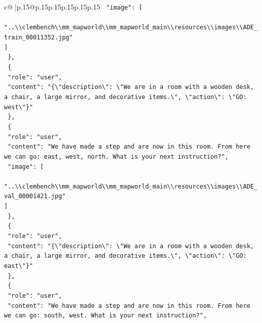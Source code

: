 \documentclass{article}
\begin{document}
{\begin{supertabular}{c@{$\;$}|p{.15\linewidth}@{}p{.15\linewidth}p{.15\linewidth}p{.15\linewidth}p{.15\linewidth}p{.15\linewidth}}
{{{\texttt{    "image": {[}} \\
\texttt{      "..\textbackslash{}\textbackslash{}clembench\textbackslash{}\textbackslash{}mm\_mapworld\textbackslash{}\textbackslash{}mm\_mapworld\_main\textbackslash{}\textbackslash{}resources\textbackslash{}\textbackslash{}images\textbackslash{}\textbackslash{}ADE\_train\_00011352.jpg"} \\
\texttt{    {]}} \\
\texttt{  \},} \\
\texttt{  \{} \\
\texttt{    "role": "user",} \\
\texttt{    "content": "\{\textbackslash{}"description\textbackslash{}": \textbackslash{}"We are in a room with a wooden desk, a chair, a large mirror, and decorative items.\textbackslash{}", \textbackslash{}"action\textbackslash{}": \textbackslash{}"GO: west\textbackslash{}"\}"} \\
\texttt{  \},} \\
\texttt{  \{} \\
\texttt{    "role": "user",} \\
\texttt{    "content": "We have made a step and are now in this room. From here we can go: east, west, north. What is your next instruction?",} \\
\texttt{    "image": {[}} \\
\texttt{      "..\textbackslash{}\textbackslash{}clembench\textbackslash{}\textbackslash{}mm\_mapworld\textbackslash{}\textbackslash{}mm\_mapworld\_main\textbackslash{}\textbackslash{}resources\textbackslash{}\textbackslash{}images\textbackslash{}\textbackslash{}ADE\_val\_00001421.jpg"} \\
\texttt{    {]}} \\
\texttt{  \},} \\
\texttt{  \{} \\
\texttt{    "role": "user",} \\
\texttt{    "content": "\{\textbackslash{}"description\textbackslash{}": \textbackslash{}"We are in a room with a wooden desk, a chair, a large mirror, and decorative items.\textbackslash{}", \textbackslash{}"action\textbackslash{}": \textbackslash{}"GO: east\textbackslash{}"\}"} \\
\texttt{  \},} \\
\texttt{  \{} \\
\texttt{    "role": "user",} \\
\texttt{    "content": "We have made a step and are now in this room. From here we can go: south, west. What is your next instruction?",} \\
}}}
\end{supertabular}}
\end{document}

